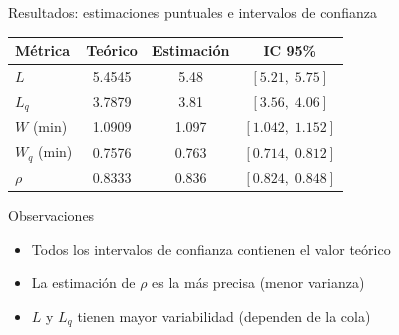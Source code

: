 \documentclass[aspectratio=1610, 9pt]{beamer}
\begin{document}
\begin{frame}{Resultados: estimaciones puntuales e intervalos de confianza}

\begin{center}
\renewcommand{\arraystretch}{1.5}
\begin{tabular}{lccc}
\toprule
\textbf{Métrica} & \textbf{Teórico} & \textbf{Estimación} & \textbf{IC 95\%} \\
\midrule
$L$ & 5.4545 & 5.48 & $[5.21, \; 5.75]$ \\
$L_q$ & 3.7879 & 3.81 & $[3.56, \; 4.06]$ \\
$W$ (min) & 1.0909 & 1.097 & $[1.042, \; 1.152]$ \\
$W_q$ (min) & 0.7576 & 0.763 & $[0.714, \; 0.812]$ \\
$\rho$ & 0.8333 & 0.836 & $[0.824, \; 0.848]$ \\
\bottomrule
\end{tabular}
\end{center}

\vspace{0.3cm}
\begin{block}{Observaciones}
\begin{itemize}
    \item Todos los intervalos de confianza contienen el valor teórico
    \item La estimación de $\rho$ es la más precisa (menor varianza)
    \item $L$ y $L_q$ tienen mayor variabilidad (dependen de la cola)
\end{itemize}
\end{block}
\end{frame}
\end{document}
